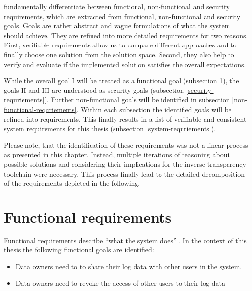 \documentclass[../main.tex]{subfiles}
\begin{document}
\citeauthor{Fabian2010} fundamentally differentiate between functional, non-functional and security requirements, which are extracted from functional, non-functional and security goals.
Goals are rather abstract and vague formulations of what the system should achieve. 
They are refined into more detailed requirements for two reasons.
First, verifiable requirements allow us to compare different approaches and to finally choose one solution from the solution space. 
Second, they also help to verify and evaluate if the implemented solution satisfies the overall expectations. \cite{Fabian2010}

While the overall goal I will be treated as a functional goal (subsection \ref{functional-requriements}), the goals II and III are understood as security goals (subsection \ref{security-requriements}).
Further non-functional goals will be identified in subsection \ref{non-functional-requriements}.
Within each subsection the identified goals will be refined into requirements.
This finally results in a list of verifiable and consistent system requirements for this thesis (subsection \ref{system-requriements}).

Please note, that the identification of these requirements was not a linear process as presented in this chapter.
Instead, multiple iterations of reasoning about possible solutions and considering their implications for the inverse transparency toolchain were necessary.
This process finally lead to the detailed decomposition of the requirements depicted in the following.


\newpage
\section{Functional requirements}\label{functional-requriements}
Functional requirements describe \enquote{what the system does} \cite[11]{Mylopoulos1992}.
In the context of this thesis the following functional goals are identified:
\begin{itemize}
    \item Data owners need to to share their log data with other users in the system.
    \item Data owners need to revoke the access of other users to their log data
\end{itemize}
\end{document}
